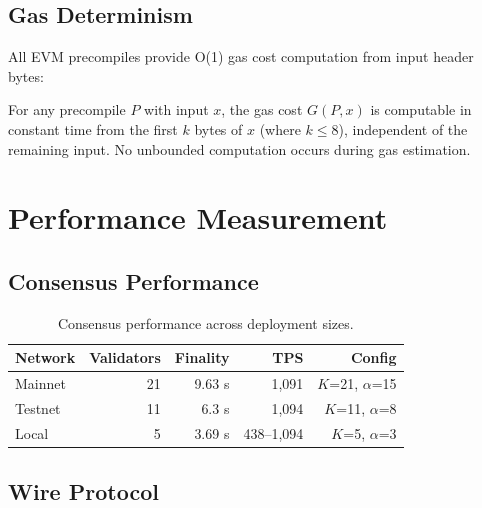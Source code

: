 \documentclass[11pt,letterpaper]{article}
\begin{document}
\subsection{Gas Determinism}

All EVM precompiles provide O(1) gas cost computation from input header bytes:

\begin{theorem}
For any precompile $P$ with input $x$, the gas cost $G(P, x)$ is computable in constant time from the first $k$ bytes of $x$ (where $k \leq 8$), independent of the remaining input. No unbounded computation occurs during gas estimation.
\end{theorem}

\section{Performance Measurement}

\subsection{Consensus Performance}

\begin{table}[H]
\centering
\begin{tabular}{@{}lrrrr@{}}
\toprule
\textbf{Network} & \textbf{Validators} & \textbf{Finality} & \textbf{TPS} & \textbf{Config} \\
\midrule
Mainnet & 21 & 9.63 s & 1,091 & $K$=21, $\alpha$=15 \\
Testnet & 11 & 6.3 s & 1,094 & $K$=11, $\alpha$=8 \\
Local & 5 & 3.69 s & 438--1,094 & $K$=5, $\alpha$=3 \\
\bottomrule
\end{tabular}
\caption{Consensus performance across deployment sizes.}
\label{tab:consensus-perf}
\end{table}

\subsection{Wire Protocol}
\end{document}
